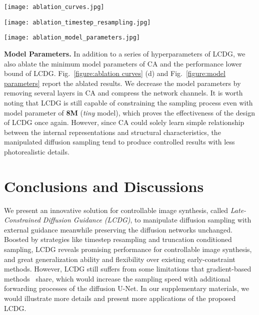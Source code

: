 \documentclass{article}
\begin{document}
\begin{figure*}[t!]
\centering
\texttt{[image: ablation\_curves.jpg]} \vspace{-1em}
\caption{Curves of FID scores for ablation studies of (a) controlling scale, (b) truncation threshold, (c) timestep resampling magnitude, and (d) model parameters of CA.}
\label{figure:ablation curves}
\end{figure*}

\begin{figure*}[t!]
\centering
\texttt{[image: ablation\_timestep\_resampling.jpg]} \vspace{-1em}
\caption{Qualitative results for the ablation studies of timestep resampling magnitude.}
\label{figure:timestep resampling magnitude}
\end{figure*}

\begin{figure*}[t!]
\centering
\texttt{[image: ablation\_model\_parameters.jpg]} \vspace{-1em}
\caption{Qualitative results for the ablation studies of model parameters of CA.}
\label{figure:model parameters}
\vspace{-1em}
\end{figure*}

\textbf{Model Parameters.} In addition to a series of hyperparameters of LCDG, we also ablate the minimum model parameters of CA and the performance lower bound of LCDG. Fig.~\ref{figure:ablation curves} (d) and Fig.~\ref{figure:model parameters} report the ablated results. We decrease the model parameters by removing several layers in CA and compress the network channels. It is worth noting that LCDG is still capable of  constraining the sampling process even with model parameter of \textbf{8M} (\textit{tiny} model), which proves the effectiveness of the design of LCDG once again. However, since CA could solely learn simple relationship between the internal representations and structural characteristics, the manipulated diffusion sampling tend to produce controlled results with less photorealistic details.

\section{Conclusions and Discussions}
We present an innovative solution for controllable image synthesis, called \textit{Late-Constrained Diffusion Guidance (LCDG)}, to manipulate diffusion sampling with external guidance meanwhile preserving the diffusion networks unchanged. Boosted by strategies like timestep resampling and truncation conditioned sampling, LCDG reveals promising performance for controllable image synthesis, and great generalization ability and flexibility over existing early-constraint methods. However, LCDG still suffers from some limitations that gradient-based methods~\cite{dhariwal2021diffusion, ho2022classifier} share, which would increase the sampling speed with additional forwarding processes of the diffusion U-Net. In our supplementary materials, we would illustrate more details and present more applications of the proposed LCDG.
\end{document}
